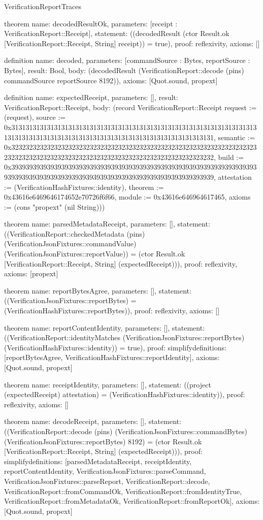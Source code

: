 \begin{lexlean}{VerificationReportTraces}
\begin{semanticmodule}
theorem{
  name: decodedResultOk,
  parameters: [receipt : VerificationReport::Receipt],
  statement: ((decodedResult (ctor Result.ok [VerificationReport::Receipt, String] receipt)) = true),
  proof: reflexivity{},
  axioms: []
}

definition{
  name: decoded,
  parameters: [commandSource : Bytes, reportSource : Bytes],
  result: Bool,
  body: (decodedResult (VerificationReport::decode (pins) commandSource reportSource 8192)),
  axioms: [Quot.sound, propext]
}

definition{
  name: expectedReceipt,
  parameters: [],
  result: VerificationReport::Receipt,
  body: (record VerificationReport::Receipt {request := (request), source := 0x31313131313131313131313131313131313131313131313131313131313131313131313131313131313131313131313131313131313131313131313131313131, semantic := 0x32323232323232323232323232323232323232323232323232323232323232323232323232323232323232323232323232323232323232323232323232323232, build := 0x39393939393939393939393939393939393939393939393939393939393939393939393939393939393939393939393939393939393939393939393939393939, attestation := (VerificationHashFixtures::identity), theorem := 0x43616e6469646174652e70726f6f66, module := 0x43616e646964617465, axioms := (cons "propext" (nil String))})
}

theorem{
  name: parsedMetadataReceipt,
  parameters: [],
  statement: ((VerificationReport::checkedMetadata (pins) (VerificationJsonFixtures::commandValue) (VerificationJsonFixtures::reportValue)) = (ctor Result.ok [VerificationReport::Receipt, String] (expectedReceipt))),
  proof: reflexivity{},
  axioms: [propext]
}

theorem{
  name: reportBytesAgree,
  parameters: [],
  statement: ((VerificationJsonFixtures::reportBytes) = (VerificationHashFixtures::reportBytes)),
  proof: reflexivity{},
  axioms: []
}

theorem{
  name: reportContentIdentity,
  parameters: [],
  statement: ((VerificationReport::identityMatches (VerificationJsonFixtures::reportBytes) (VerificationHashFixtures::identity)) = true),
  proof: simplify{definitions: [reportBytesAgree, VerificationHashFixtures::reportIdentity]},
  axioms: [Quot.sound, propext]
}

theorem{
  name: receiptIdentity,
  parameters: [],
  statement: ((project (expectedReceipt) attestation) = (VerificationHashFixtures::identity)),
  proof: reflexivity{},
  axioms: []
}

theorem{
  name: decodeReceipt,
  parameters: [],
  statement: ((VerificationReport::decode (pins) (VerificationJsonFixtures::commandBytes) (VerificationJsonFixtures::reportBytes) 8192) = (ctor Result.ok [VerificationReport::Receipt, String] (expectedReceipt))),
  proof: simplify{definitions: [parsedMetadataReceipt, receiptIdentity, reportContentIdentity, VerificationJsonFixtures::parseCommand, VerificationJsonFixtures::parseReport, VerificationReport::decode, VerificationReport::fromCommandOk, VerificationReport::fromIdentityTrue, VerificationReport::fromMetadataOk, VerificationReport::fromReportOk]},
  axioms: [Quot.sound, propext]
}


\end{semanticmodule}
\end{lexlean}
